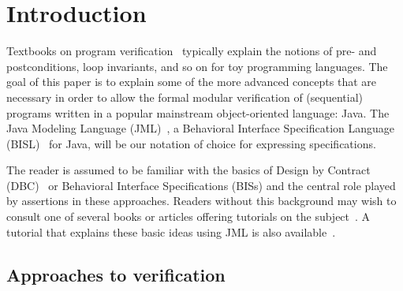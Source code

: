 \documentclass{llncs}
\begin{document}
\section{Introduction}



Textbooks on program 
verification~ typically explain the
notions of pre- and postconditions, loop invariants, and so on for toy
programming languages.
%
The goal of this paper is to explain some of the more advanced concepts that
are necessary in order to allow the formal modular verification of
(sequential) programs written in a popular mainstream object-oriented
language: Java.
%
The Java Modeling Language 
(JML)~\cite{STTT05,Leavens-Baker-Ruby06,Leavens-etal06}, a Behavioral Interface
Specification Language (BISL)~\cite{Wing90a} for Java, will be our
notation of choice for expressing specifications.

The reader is assumed to be familiar with the basics of Design by
Contract (DBC)~\cite{Meyer97} or Behavioral Interface Specifications (BISs)
and the central role played by assertions in these approaches.
%
Readers without this background may wish to consult one of several
books or articles offering tutorials on the 
subject~\cite{Hoare69,Liskov-Guttag01,Mitchell-McKim02,Meyer92a,Meyer97,Morgan94}.
%
A tutorial that explains these basic ideas using JML is also 
available~\cite{Leavens-Cheon05}.


\subsection{Approaches to verification}
%
%
\end{document}
